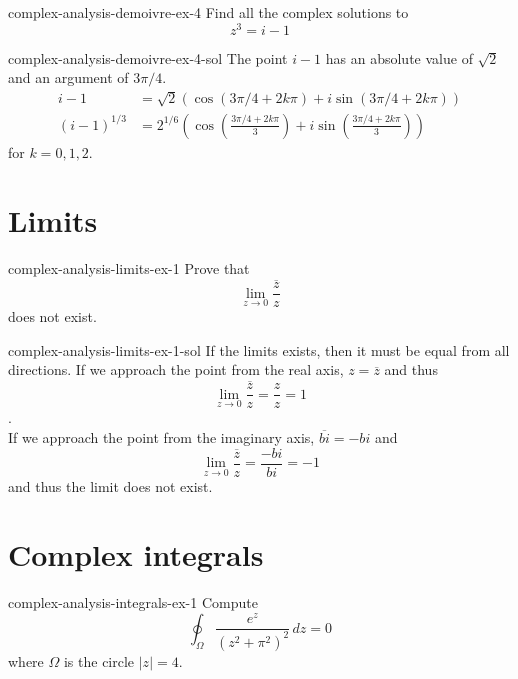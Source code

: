 \documentclass[preview]{standalone}
\begin{document}
\begin{snippetexercise}{complex-analysis-demoivre-ex-4}{} %
    Find all the complex solutions to
    \[ z^3 = i-1 \]
\end{snippetexercise}

\begin{snippetsolution}{complex-analysis-demoivre-ex-4-sol}{}
    The point \(i-1\) has an absolute value of \(\sqrt{2}\)
    and an argument of \(3\pi/4\).
    \begin{align*}
        i-1 &= \sqrt{2} \left(
            \cos(3\pi/4 +2k\pi) + i\sin(3\pi/4 +2k\pi)
        \right) \\
        (i-1)^{1/3} &= 2^{1/6}
        \left(
            \cos\left( \frac{3\pi/4 + 2k\pi}{3} \right)
            + i \sin\left( \frac{3\pi/4 + 2k\pi}{3} \right)
        \right)
    \end{align*}
    for \(k=0,1,2\).
\end{snippetsolution}

\section{Limits}

\begin{snippetexercise}{complex-analysis-limits-ex-1}{} %
    Prove that \[ \lim_{z \to 0} \dfrac{\overline{z}}{z} \]
    does not exist.
\end{snippetexercise}

\begin{snippetsolution}{complex-analysis-limits-ex-1-sol}{}
    If the limits exists, then it must be equal from all directions.
    If we approach the point from the real axis,
    \(z = \overline{z}\) and thus
    \[ \lim_{z \to 0} \dfrac{\overline{z}}{z} = \frac{z}{z} = 1 \]. \\
    If we approach the point from the imaginary axis,
    \( \overline{bi} = -bi \) and
    \[ \lim_{z \to 0} \dfrac{\overline{z}}{z} = \frac{-bi}{bi} = -1 \]
    and thus the limit does not exist.
\end{snippetsolution}

\section{Complex integrals}

\begin{snippetexercise}{complex-analysis-integrals-ex-1}{} %
    Compute \[ \oint_\Omega \frac{e^z}{{(z^2 + \pi^2)}^2} \,dz = 0 \]
    where \(\Omega\) is the circle \(|z|=4\).
\end{snippetexercise}
\end{document}
